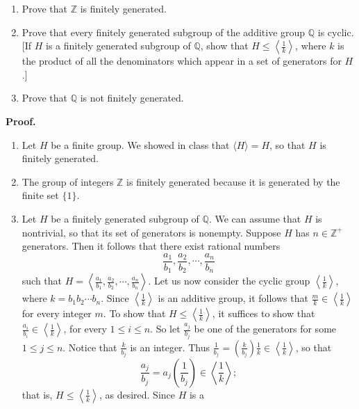 \documentclass[9pt]{article}
\newcommand{\cyc}[1]{\langle #1 \rangle}
\newcommand{\Z}{\mathbb{Z}}
\newcommand{\Q}{\mathbb{Q}}
\newcommand{\CYC}[1]{\left\langle #1 \right\rangle}
\begin{document}
\begin{enumerate}
\begin{enumerate}
                     \item Prove that $\Z$ is finitely generated.
                     \item Prove that every finitely generated subgroup of the
                           additive group $\Q$ is cyclic. [If $H$ is a finitely
                           generated subgroup of $\Q$, show that
                           $H \le \CYC{\frac{1}{k}}$, where $k$ is the product
                           of all the denominators which appear in a set of
                           generators for $H$.]
                     \item Prove that $\Q$ is not finitely generated.
                  \end{enumerate}

      \textbf{Proof.}

      \begin{enumerate}
         \item Let $H$ be a finite group. We showed in class that $\cyc{H} = H$,
               so that $H$ is finitely generated.
         \item The group of integers $\Z$ is finitely generated because it is
               generated by the finite set $\{1\}$.
         \item Let $H$ be a finitely generated subgroup of $\Q$. We can assume
               that $H$ is nontrivial, so that its set of generators is
               nonempty. Suppose $H$ has $n \in \Z^+$ generators. Then it
               follows that there exist rational numbers
               $$\frac{a_1}{b_1}, \frac{a_2}{b_2}, \cdots,\frac{a_n}{b_n}$$
               such that $H = \CYC{\frac{a_1}{b_1}, \frac{a_2}{b_2}, \cdots,
               \frac{a_n}{b_n}}$. Let us now consider the cyclic group
               $\CYC{\frac{1}{k}}$, where $k = b_1b_2\cdots b_n$. Since
               $\CYC{\frac{1}{k}}$ is an additive group, it follows that
               $\frac{m}{k} \in \CYC{\frac{1}{k}}$ for every integer $m$. To
               show that $H \le \CYC{\frac{1}{k}}$, it suffices to show that
               $\frac{a_i}{b_i} \in \CYC{\frac{1}{k}}$, for every
               $1 \le i \le n$. So let $\frac{a_j}{b_j}$ be one of the
               generators for some $1 \le j \le n$. Notice that $\frac{k}{b_j}$
               is an integer. Thus $\frac{1}{b_j}  =
               \left(\frac{k}{b_j}\right)\frac{1}{k} \in \CYC{\frac{1}{k}}$, so
               that
               $$\frac{a_j}{b_j} = a_j \left(\frac{1}{b_j}\right) \in
               \CYC{\frac{1}{k}};$$
               that is, $H \le \CYC{\frac{1}{k}}$, as desired. Since $H$ is a

\end{enumerate}
\end{enumerate}
\end{document}

